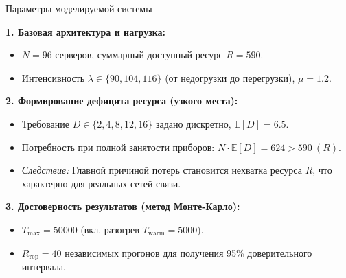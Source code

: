 \documentclass[aspectratio=169,12pt]{beamer}
\begin{document}
\begin{frame}{Параметры моделируемой системы}

\textbf{1. Базовая архитектура и нагрузка:}
\begin{itemize}
    \item $N = 96$ серверов, суммарный доступный ресурс $R = 590$.
    \item Интенсивность $\lambda \in \{90, 104, 116\}$ (от недогрузки до перегрузки), $\mu = 1.2$.
\end{itemize}

\vspace{0.2cm}
\textbf{2. Формирование дефицита ресурса (узкого места):}
\begin{itemize}
    \item Требование $D \in \{2, 4, 8, 12, 16\}$ задано дискретно, $\mathbb{E}[D] = 6.5$.
    \item Потребность при полной занятости приборов: $N \cdot \mathbb{E}[D] = 624 > 590 \ (R)$.
    \item \textit{Следствие:} Главной причиной потерь становится нехватка ресурса $R$, что характерно для реальных сетей связи.
\end{itemize}

\vspace{0.2cm}
\textbf{3. Достоверность результатов (метод Монте-Карло):}
\begin{itemize}
    \item $T_{\max} = 50000$ (вкл. разогрев $T_{\mathrm{warm}} = 5000$).
    \item $R_{\mathrm{rep}} = 40$ независимых прогонов для получения 95\% доверительного интервала.
\end{itemize}

\end{frame}
\end{document}
